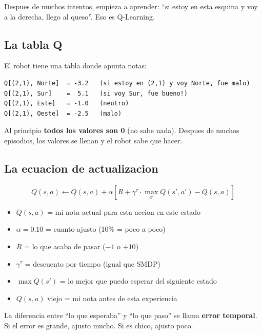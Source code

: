 \documentclass[11pt,a4paper]{article}
\newcommand{\vocab}[1]{\textbf{\textcolor{accentblue}{#1}}}
\begin{document}
Despues de muchos intentos, empieza a aprender: ``si estoy en esta esquina y voy a la derecha, llego al queso''. Eso es Q-Learning.

\subsection{La tabla Q}

El robot tiene una tabla donde apunta notas:

\begin{lstlisting}
Q[(2,1), Norte]  = -3.2   (si estoy en (2,1) y voy Norte, fue malo)
Q[(2,1), Sur]    =  5.1   (si voy Sur, fue bueno!)
Q[(2,1), Este]   = -1.0   (neutro)
Q[(2,1), Oeste]  = -2.5   (malo)
\end{lstlisting}

Al principio \textbf{todos los valores son 0} (no sabe nada). Despues de muchos episodios, los valores se llenan y el robot sabe que hacer.

\subsection{La ecuacion de actualizacion}

\begin{equation}
Q(s,a) \leftarrow Q(s,a) + \alpha \left[ R + \gamma^\tau \cdot \max_{a'} Q(s',a') - Q(s,a) \right]
\end{equation}

\begin{definicion}[Desglose]
\begin{itemize}
    \item $Q(s,a)$ = mi nota actual para esta accion en este estado
    \item $\alpha = 0.10$ = cuanto ajusto (10\% = poco a poco)
    \item $R$ = lo que acaba de pasar ($-1$ o $+10$)
    \item $\gamma^\tau$ = descuento por tiempo (igual que SMDP)
    \item $\max Q(s')$ = lo mejor que puedo esperar del siguiente estado
    \item $Q(s,a)$ viejo = mi nota antes de esta experiencia
\end{itemize}
\end{definicion}

La diferencia entre ``lo que esperaba'' y ``lo que paso'' se llama \vocab{error temporal}. Si el error es grande, ajusto mucho. Si es chico, ajusto poco.

\newpage
\end{document}
